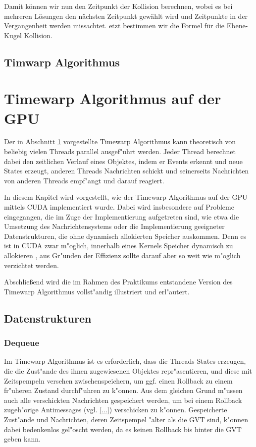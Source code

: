 \documentclass[a4paper, 10pt, openright, parskip, chapterprefix]{scrreprt}
\begin{document}
\noindent Damit können wir nun den Zeitpunkt der Kollision berechnen, wobei es bei mehreren Lösungen den nächsten Zeitpunkt gewählt wird und Zeitpunkte in der Vergangenheit werden missachtet. etzt bestimmen wir die Formel für die Ebene-Kugel Kollision.
\section{Timwarp Algorithmus}
\label{sec:TimewarpAlgoritmus}




\chapter{Timewarp Algorithmus auf der GPU}
Der in Abschnitt \ref{sec:TimewarpAlgoritmus} vorgestellte Timewarp Algorithmus kann theoretisch von beliebig vielen Threads
parallel ausgef"uhrt werden. Jeder Thread berechnet dabei den zeitlichen Verlauf eines Objektes, indem er Events erkennt
und neue States erzeugt, anderen Threads Nachrichten schickt und seinerseits Nachrichten von anderen Threads empf"angt
und darauf reagiert. 

In diesem Kapitel wird vorgestellt, wie der Timewarp Algorithmus auf der GPU mittels CUDA implementiert wurde. Dabei wird
insbesondere auf Probleme eingegangen, die im Zuge der Implementierung aufgetreten sind, wie etwa die Umsetzung des
Nachrichtensystems oder die Implementierung geeigneter Datenstrukturen, die ohne dynamisch allokierten Speicher
auskommen. Denn es ist in CUDA zwar m"oglich, innerhalb eines Kernels Speicher dynamisch zu allokieren \cite{...}, aus
Gr"unden der Effizienz sollte darauf aber so weit wie m"oglich verzichtet werden.

Abschlie\ss end wird die im Rahmen des Praktikums entstandene Version des Timewarp Algorithmus vollst"andig illustriert
und erl"autert.

\section{Datenstrukturen}
\subsection{Dequeue}
Im Timewarp Algorithmus ist es erforderlich, dass die Threads States erzeugen, die die Zust"ande des ihnen zugewiesenen
Objektes repr"asentieren, und diese mit Zeitspempeln versehen zwischenspeichern, um ggf. einen Rollback zu einem
fr"uheren Zustand durchf"uhren zu k"onnen. Aus dem gleichen Grund m"ussen auch alle verschickten Nachrichten gespeichert
werden, um bei einem Rollback zugeh"orige Antimessages (vgl. \ref{...}) verschicken zu k"onnen.
Gespeicherte Zust"ande und Nachrichten, deren Zeitspempel "alter als die GVT sind, k"onnen dabei bedenkenlos gel"oscht
werden, da es keinen Rollback bis hinter die GVT geben kann.
\end{document}
